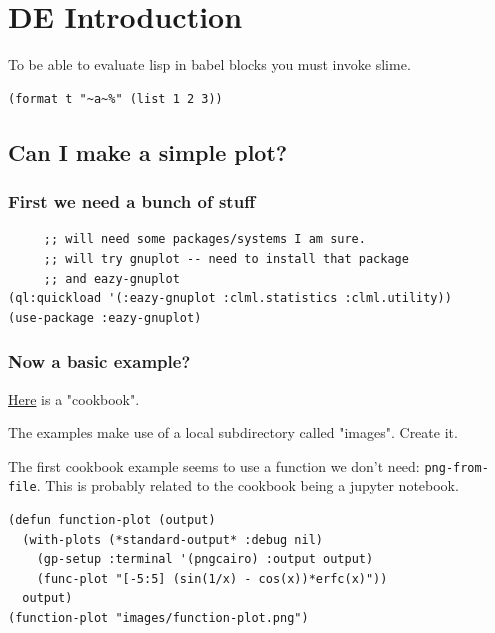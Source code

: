 \documentclass[11pt]{article}
\author{Britt Anderson}
\date{\today}
\title{}
\begin{document}
\tableofcontents

\section{DE Introduction}
\label{sec:org269dba7}

To be able to evaluate lisp in babel blocks you must invoke slime. 
\begin{verbatim}
(format t "~a~%" (list 1 2 3))
\end{verbatim}


\subsection{Can I make a simple plot?}
\label{sec:orge76eb8c}

\subsubsection{First we need a bunch of stuff}
\label{sec:org4cd452a}
\begin{verbatim}
     ;; will need some packages/systems I am sure.
     ;; will try gnuplot -- need to install that package
     ;; and eazy-gnuplot
(ql:quickload '(:eazy-gnuplot :clml.statistics :clml.utility))
(use-package :eazy-gnuplot) 
\end{verbatim}

\subsubsection{Now a basic example?}
\label{sec:org3211d69}
\href{https://guicho271828.github.io/eazy-gnuplot/}{Here} is a "cookbook".

The examples make use of a local subdirectory called "images". Create it.

The first cookbook example seems to use a function we don't need: \texttt{png-from-file}. This is probably related to the cookbook being a jupyter notebook.

\begin{verbatim}
(defun function-plot (output)
  (with-plots (*standard-output* :debug nil)
    (gp-setup :terminal '(pngcairo) :output output)
    (func-plot "[-5:5] (sin(1/x) - cos(x))*erfc(x)"))
  output)
(function-plot "images/function-plot.png")
\end{verbatim}
\end{document}

